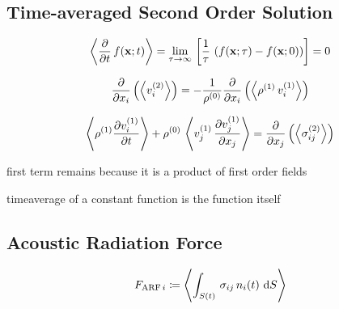 \subsection{Time-averaged Second Order Solution\label{Th-avg-nd-order}}

\begin{equation}
  \left\langle \pdv{t}\,f(\vb{x};t) \right\rangle = \lim\limits_{\tau \rightarrow \infty}{\,
    \left[ \frac{1}{\tau}\,\left( f(\vb{x}; \tau) - f(\vb{x}; 0) \right) 
  \right]} = 0
  \label{eq:Th-avg-property}
\end{equation}


\begin{equation}
  \pdv{x_{i}}\left( \left\langle v_{i}^{(2)} \right\rangle \right) = 
  -\frac{1}{\rho^{(0)}} \pdv{x_{i}}\left(\left\langle  
  \rho^{(1)}\,v_{i}^{(1)}  \right\rangle\right)
  \label{eq:Th-avg-massconservatio}
\end{equation}

\begin{equation}
  \left\langle \rho^{(1)} \pdv{  v_{i}^{(1)}  }{t} \right\rangle + 
  \rho^{(0)}\,\left\langle v_{j}^{(1)}\,\pdv{  v_{j}^{(1)}  }{x_{j}} \right\rangle 
  = \pdv{x_{j}}\left( \left\langle \sigma_{ij}^{(2)} \right\rangle \right)
  \label{eq:Th-avg-navier}
\end{equation}

first term remains because it is a product of first order fields

timeaverage of a constant function is the function itself

\subsection{Acoustic Radiation Force\label{sec:Th-ARF}}

\begin{equation}
  F_{\mathrm{ARF}\,i} \coloneqq
  \left\langle \int_{S(t)}\,\sigma_{ij}\,n_{i}(t)\,\dd{S} \right\rangle
  \label{eq:Th-def-ARF}
\end{equation}

